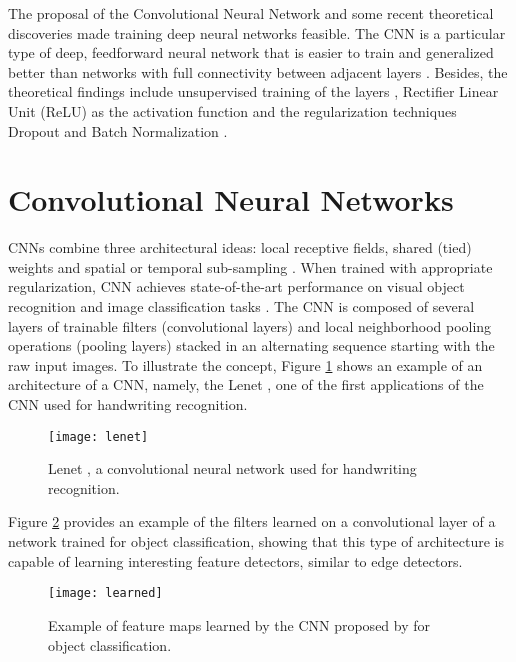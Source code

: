The proposal of the Convolutional Neural Network \cite{lecun1995convolutional} and some recent theoretical discoveries made training deep neural networks feasible. The CNN is a particular type of deep, feedforward neural network that is easier to train and generalized better than networks with full connectivity between adjacent layers \cite{lecun2015deep}. Besides, the theoretical findings include unsupervised training of the layers \cite{hinton2006fast}, Rectifier Linear Unit (ReLU) \cite{nair2010rectified} as the activation function and the regularization techniques Dropout \cite{srivastava2014dropout} and Batch Normalization \cite{ioffe2015batch}. 


\section{Convolutional Neural Networks}
CNNs combine three architectural ideas: local receptive fields, shared
(tied) weights and spatial or temporal sub-sampling \cite{lecun1998gradient}. When trained with appropriate regularization, CNN achieves state-of-the-art performance
on visual object recognition and image classification tasks \cite{lecun2015deep}. The CNN is composed of several layers of trainable filters (convolutional layers) and local neighborhood pooling operations (pooling layers) stacked in an alternating sequence starting with the raw input images. To illustrate the concept, Figure \ref{lenet} shows an example of an architecture of a CNN, namely, the Lenet \cite{lecun1998gradient}, one of the first applications of the CNN used for handwriting recognition.

\begin{figure}[!htb]
\centering
\texttt{[image: lenet]}
\caption{Lenet \cite{lecun1998gradient}, a convolutional neural network used for handwriting recognition.}
\label{lenet}
\end{figure}

Figure \ref{learned} provides an example of the filters learned on a convolutional layer of a network trained for object classification, showing that this type of architecture is
capable of learning interesting feature detectors, similar to edge detectors.
\begin{figure}[!htb]
\centering
\texttt{[image: learned]}
\caption{Example of feature maps learned by the CNN proposed by \cite{krizhevsky2012imagenet} for object classification.}
\label{learned}
\end{figure}



